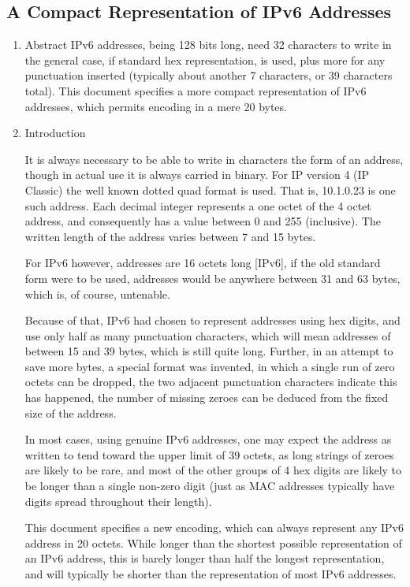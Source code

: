 \documentclass{article}
\begin{document}
\subsection{A Compact Representation of IPv6 Addresses}
\begin{enumerate}

   \item Abstract IPv6 addresses, being 128 bits long, need 32 characters to write in
   the general case, if standard hex representation, is used, plus more
   for any punctuation inserted (typically about another 7 characters,
   or 39 characters total).  This document specifies a more compact
   representation of IPv6 addresses, which permits encoding in a mere 20
   bytes.

   \item Introduction

   It is always necessary to be able to write in characters the form of
   an address, though in actual use it is always carried in binary.  For
   IP version 4 (IP Classic) the well known dotted quad format is used.
   That is, 10.1.0.23 is one such address.  Each decimal integer
   represents a one octet of the 4 octet address, and consequently has a
   value between 0 and 255 (inclusive).  The written length of the
   address varies between 7 and 15 bytes.

   For IPv6 however, addresses are 16 octets long [IPv6], if the old
   standard form were to be used, addresses would be anywhere between 31
   and 63 bytes, which is, of course, untenable.

   Because of that, IPv6 had chosen to represent addresses using hex
   digits, and use only half as many punctuation characters, which will
   mean addresses of between 15 and 39 bytes, which is still quite long.
   Further, in an attempt to save more bytes, a special format was
   invented, in which a single run of zero octets can be dropped, the
   two adjacent punctuation characters indicate this has happened, the
   number of missing zeroes can be deduced from the fixed size of the
   address.

   In most cases, using genuine IPv6 addresses, one may expect the
   address as written to tend toward the upper limit of 39 octets, as
   long strings of zeroes are likely to be rare, and most of the other groups of 4 hex digits are likely to be longer than a single non-zero
   digit (just as MAC addresses typically have digits spread throughout
   their length).

   This document specifies a new encoding, which can always represent
   any IPv6 address in 20 octets.  While longer than the shortest
   possible representation of an IPv6 address, this is barely longer
   than half the longest representation, and will typically be shorter
   than the representation of most IPv6 addresses.


\end{enumerate}
\end{document}
